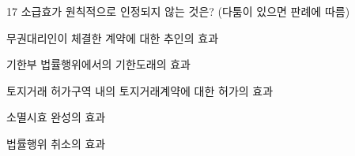 \begin{question}{17}
소급효가 원칙적으로 인정되지 않는 것은? (다툼이 있으면 판례에 따름)
\begin{choices}
  \item 무권대리인이 체결한 계약에 대한 추인의 효과
  \item 기한부 법률행위에서의 기한도래의 효과
  \item 토지거래 허가구역 내의 토지거래계약에 대한 허가의 효과
  \item 소멸시효 완성의 효과
  \item 법률행위 취소의 효과
\end{choices}
\end{question}
